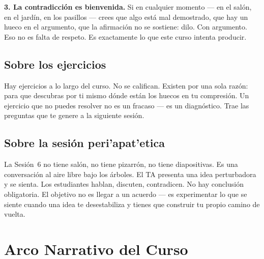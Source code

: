 \documentclass[11pt, letterpaper]{article}
\begin{document}
\textbf{3. La contradicci\'on es bienvenida.}
Si en cualquier momento --- en el sal\'on, en el jard\'in, en los pasillos --- crees que algo est\'a mal demostrado, que hay un hueco en el argumento, que la afirmaci\'on no se sostiene: dilo. Con argumento. Eso no es falta de respeto. Es exactamente lo que este curso intenta producir.

\subsection*{Sobre los ejercicios}

Hay ejercicios a lo largo del curso. No se califican. Existen por una sola raz\'on: para que descubras por ti mismo d\'onde est\'an los huecos en tu compresi\'on. Un ejercicio que no puedes resolver no es un fracaso --- es un diagn\'ostico. Trae las preguntas que te genere a la siguiente sesi\'on.

\subsection*{Sobre la sesi\'on peri'apat'etica}

La Sesi\'on~6 no tiene sal\'on, no tiene pizarr\'on, no tiene diapositivas. Es una conversaci\'on al aire libre bajo los \'arboles. El TA presenta una idea perturbadora y se sienta. Los estudiantes hablan, discuten, contradicen. No hay conclusi\'on obligatoria. El objetivo no es llegar a un acuerdo --- es experimentar lo que se siente cuando una idea te desestabiliza y tienes que construir tu propio camino de vuelta.

\newpage

\section{Arco Narrativo del Curso}
\end{document}
